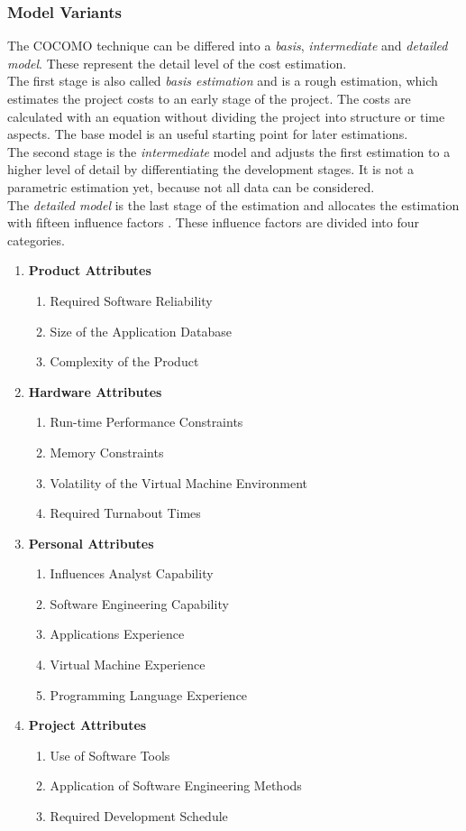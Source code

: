 \subsubsection{Model Variants}

The COCOMO technique can be differed into a \textit{basis}, \textit{intermediate} and \textit{detailed model}. These represent the detail level of the cost estimation.\\
The first stage is also called \textit{basis estimation} and is a rough estimation, which estimates the project costs to an early stage of the project. The costs are calculated with an equation without dividing the project into structure or time aspects. The base model is an useful starting point for later estimations.\\
The second stage is the \textit{intermediate} model and adjusts the first estimation to a higher level of detail by differentiating the development stages. It is not a parametric estimation yet, because not all data can be considered.\\
The \textit{detailed model} is the last stage of the estimation and allocates the estimation with fifteen influence factors \cite{jenny}. These influence factors are divided into four categories.
\begin{enumerate}
	\item \textbf{Product Attributes}
	\begin{enumerate}
		\item Required Software Reliability
		\item Size of the Application Database
		\item Complexity of the Product
	\end{enumerate}
	\item \textbf{Hardware Attributes}
	\begin{enumerate}
		\item Run-time Performance Constraints
		\item Memory Constraints
		\item Volatility of the Virtual Machine Environment 
		\item Required Turnabout Times
	\end{enumerate}
	\item \textbf{Personal Attributes}
	\begin{enumerate}
		\item Influences Analyst Capability
		\item Software Engineering Capability
		\item Applications Experience
		\item Virtual Machine Experience
		\item Programming Language Experience
	\end{enumerate}
	\item \textbf{Project Attributes}
	\begin{enumerate}
		\item Use of Software Tools
		\item Application of Software Engineering Methods
		\item Required Development Schedule
	\end{enumerate}
\end{enumerate}

